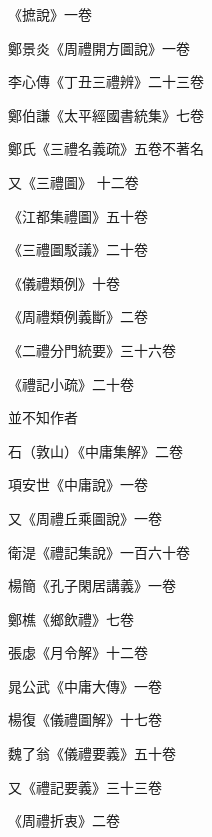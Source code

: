 \begin{pinyinscope}
 《摭說》一卷



 鄭景炎《周禮開方圖說》一卷



 李心傳《丁丑三禮辨》二十三卷



 鄭伯謙《太平經國書統集》七卷



 鄭氏《三禮名義疏》五卷不著名



 又《三禮圖》
 十二卷



 《江都集禮圖》五十卷



 《三禮圖駁議》二十卷



 《儀禮類例》十卷



 《周禮類例義斷》二卷



 《二禮分門統要》三十六卷



 《禮記小疏》二十卷



 並不知作者



 石（敦山）《中庸集解》二卷



 項安世《中庸說》一卷



 又《周禮丘乘圖說》一卷



 衛湜《禮記集說》一百六十卷



 楊簡《孔子閑居講義》一卷



 鄭樵《鄉飲禮》七卷



 張虙《月令解》十二卷



 晁公武《中庸大傳》一卷



 楊復《儀禮圖解》十七卷



 魏了翁《儀禮要義》五十卷



 又《禮記要義》三十三卷



 《周禮折衷》二卷




\end{pinyinscope}

